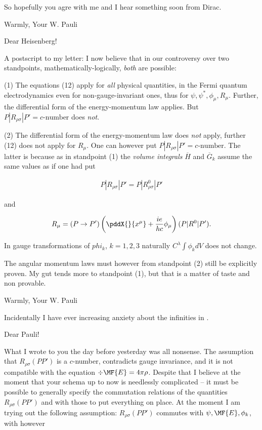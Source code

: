 \documentclass{article}
\newcommand{\nc}[2]{
  \newcommand{#1}{#2}
}
\newcommand{\uequ}[1]{
\begin{align*}
#1
\end{align*}
}
\begin{document}
So hopefully you agre with me and I hear something soon from Dirac.

Warmly,
Your W. Pauli

\date{January 27, 1934}

Dear Heisenberg!

A postscript to my letter: I now believe that in our controversy over two standpoints, mathematically-logically, \textit{both} are possible:

(1) The equations (12) apply for \textit{all} physical quantities, in the Fermi quantum electrodynamics even for non-gauge-invariant ones, thus for $\psi,\psi^*,\phi_\mu,R_\mu$. Further, the differential form of the energy-momentum law applies. But $P|R_{\rho\sigma}|P' = c\text{-number}$ does \textit{not}.

(2) The differential form of the energy-momentum law does \textit{not} apply, further (12) does not apply for $R_\mu$. One can however put $P|R_{\rho\sigma}|P' = c\text{-number}$. The latter is because as in standpoint (1) the \textit{volume integrals} $\overline{H}$ and $\overline{G}_k$ assume the same values as if one had put
\uequ{
P|R_{\rho\sigma}|P' = P|R^0_{\rho\sigma}|P'
}
and
\uequ{
R_\mu = (P \to P')\left(\pddX{}{x^\mu} + \frac{ie}{hc}\phi_\mu\right)(P|R^0|P').
}
In gauge transformations of $phi_k$, $k=1,2,3$ naturally $C^\lambda \int \phi_k {dV}$ does not change.

The angular momentum laws must however from standpoint (2) still be explicitly proven. My gut tends more to standpoint (1), but that is a matter of taste and non provable.

Warmly,
Your W. Pauli

Incidentally I have ever increasing anxiety about the infinities in .

\date{January 27, 1934}

Dear Pauli!

\nc{\fE}{\MF{E}}

What I wrote to you the day before yesterday was all nonsense. The assumption that $R_{\rho\sigma}(PP')$ is a $c$-number, contradicts gauge invariance, and it is not compatible with the equation $\div{\fE} = 4\pi\rho$. Despite that I believe at the moment that your schema up to now is needlessly complicated -- it must be possible to generally specify the commutation relations of the quantities $R_{\rho\sigma}(PP')$ and with those to put everything on place. At the moment I am trying out the following assumption: $R_{\rho\sigma}(PP')$ commutes with $\psi,\fE,\phi_k$, with however
\end{document}
